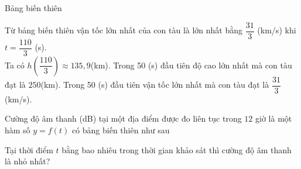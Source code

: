 \begin{ex}
{\begin{itemchoice}
			Bảng  biến thiên
			\begin{center}
			\end{center}
			Từ bảng biến thiên vận tốc lớn nhất của con tàu là  lớn nhất bằng $\dfrac{31}{3} $ (km/s) khi $t=\dfrac{110}{3}$ (s). \\
			Ta có $h\left( \dfrac{110}{3}\right)\approx 135{,}9 $(km). 
			 \itemch
			Trong 50 (s) đầu tiên độ cao lớn nhất mà con tàu đạt là  $250$(km).
			\itemch 
			Trong 50 (s) đầu tiên vận tốc lớn nhất mà con tàu đạt là $\dfrac{31}{3}  $(km/s).
		\end{itemchoice}
	 }
\end{ex}



\begin{bt}%
	Cường độ âm thanh (dB) tại một địa điểm được đo liên tục trong $12$ giờ là một hàm số $y=f(t)$ có bảng biến  thiên như sau
	\begin{center}
	\end{center}
	Tại thời điểm $t$ bằng bao nhiêu trong thời gian khảo sát thì cường độ  âm thanh là nhỏ nhất?
\end{bt}


